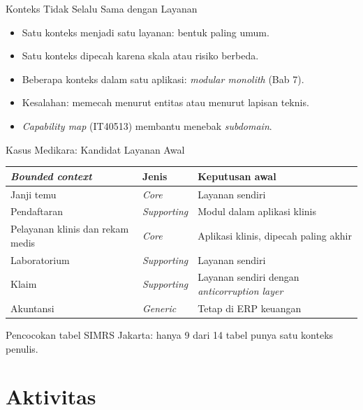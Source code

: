 \documentclass[aspectratio=169, table, 12pt]{beamer}
\begin{document}
\begin{frame}{{\Large Konteks Tidak Selalu Sama dengan Layanan}}
  \vspace{10pt}
  \begin{itemize}
    \item Satu konteks menjadi satu layanan: bentuk paling umum.
    \item Satu konteks dipecah karena skala atau risiko berbeda.
    \item Beberapa konteks dalam satu aplikasi: \textit{modular monolith} (Bab 7).
    \item Kesalahan: memecah menurut entitas atau menurut lapisan teknis.
    \item \textit{Capability map} (IT40513) membantu menebak \textit{subdomain}.
  \end{itemize}
\end{frame}

\begin{frame}{{\Large Kasus Medikara: Kandidat Layanan Awal}}
  \scriptsize
  \begin{tabularx}{\textwidth}{>{\raggedright\arraybackslash}p{3.4cm}
      >{\raggedright\arraybackslash}p{2.0cm} >{\raggedright\arraybackslash}X}
    \hline
    \textbf{\textit{Bounded context}} & \textbf{Jenis} & \textbf{Keputusan awal} \\
    \hline
    Janji temu & \textit{Core} & Layanan sendiri \\
    \hline
    Pendaftaran & \textit{Supporting} & Modul dalam aplikasi klinis \\
    \hline
    Pelayanan klinis dan rekam medis & \textit{Core} & Aplikasi klinis, dipecah
      paling akhir \\
    \hline
    Laboratorium & \textit{Supporting} & Layanan sendiri \\
    \hline
    Klaim & \textit{Supporting} & Layanan sendiri dengan \textit{anticorruption
      layer} \\
    \hline
    Akuntansi & \textit{Generic} & Tetap di ERP keuangan \\
    \hline
  \end{tabularx}

  \vspace{6pt}
  \small
  Pencocokan tabel SIMRS Jakarta: hanya 9 dari 14 tabel punya satu konteks
  penulis.
\end{frame}

\section{Aktivitas}
\end{document}
